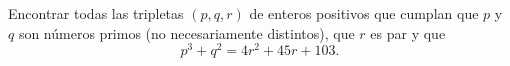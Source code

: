 Encontrar todas las tripletas $(p,q,r)$ de enteros positivos que cumplan que $p$ y $q$ son números primos (no necesariamente distintos), que $r$ es par y que
\[p^3+q^2=4r^2+45r+103.\]